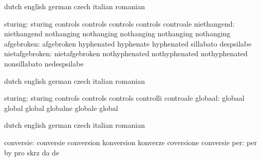 
\startvariables            dutch                     english
                           german                    czech
                           italian                   romanian

                  sturing: sturing                   controls 
                           controls                  controls 
                           controls                  controale
              niethangend: niethangend               nothanging
                           nothanging                nothanging
                           nothanging                nothanging
               afgebroken: afgebroken                hyphenated 
                           hyphenate                 hyphenated
                           sillabato                 despsilabe
           nietafgebroken: nietafgebroken            nothyphenated 
                           nothyphenated             nothyphenated 
                           nonsillabato              nedespsilabe

\stopvariables

\startconstants            dutch                     english
                           german                    czech
                           italian                   romanian

                  sturing: sturing                   controls 
                           controls                  controls 
                           controlli                  controale
                  globaal: globaal                   global
                           global                    globalne
                           globale                   global

\stopconstants





\startvariables            dutch                     english
                           german                    czech
                           italian                   romanian

                conversie: conversie                 conversion
                           konversion                konverze
                           coversione                conversie
                      per: per                       by
                           pro                       skrz
                           da                        de

